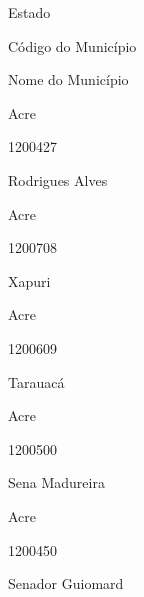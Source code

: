 \documentclass[
  letterpaper,
]{report}
\begin{document}
\n  

\n    

\n      

Estado

\n      

Código do Município

\n      

Nome do Município

\n    

\n  

\n  

\n    

\n      

Acre

\n      

1200427

\n      

Rodrigues Alves

\n    

\n    

\n      

Acre

\n      

1200708

\n      

Xapuri

\n    

\n    

\n      

Acre

\n      

1200609

\n      

Tarauacá

\n    

\n    

\n      

Acre

\n      

1200500

\n      

Sena Madureira

\n    

\n    

\n      

Acre

\n      

1200450

\n      

Senador Guiomard

\n    

\n    

\n      
\end{document}

